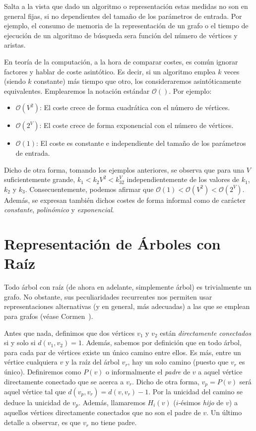 \documentclass[10pt,spanish,twocolumn]{article}
\begin{document}
\vspace{4mm}
Salta a la vista que dado un algoritmo o representación estas medidas no son en 
general fijas, si no dependientes del tamaño de los parámetros de entrada.  Por 
ejemplo, el consumo de memoria de la representación de un grafo o el tiempo de 
ejecución de un algoritmo de búsqueda sera función del número de vértices y 
aristas.

En teoría de la computación, a la hora de comparar costes, es común ignorar 
factores y hablar de coste asintótico.  Es decir, si un algoritmo emplea $k$ 
veces (siendo $k$ constante) más tiempo que otro, los consideraremos 
asintóticamente equivalentes.  Emplearemos la notación estándar 
$\mathcal{O}()$.  Por ejemplo:

\begin{itemize}
    \item $\mathcal{O}(V^2)$: El coste crece de forma cuadrática con el número 
de vértices.
    \item $\mathcal{O}(2^V)$: El coste crece de forma exponencial con el número 
de vértices.
    \item $\mathcal{O}(1)$: El coste es constante e independiente del tamaño de 
los parámetros de entrada.
\end{itemize}

Dicho de otra forma, tomando los ejemplos anteriores, se observa que para una 
$V$ suficientemente grande, $k_1 < k_2V^2 < k_32^V$ independientemente de los 
valores de $k_1$, $k_2$ y $k_3$.  Consecuentemente, podemos afirmar que 
$\mathcal{O}(1) < \mathcal{O}(V^2) < \mathcal{O}(2^V)$.  Además,
se expresan también dichos costes de forma informal como de carácter
\emph{constante}, \emph{polinómico} y \emph{exponencial}.

\section{Representación de Árboles con Raíz}
Todo árbol con raíz (de ahora en adelante, simplemente árbol) es trivialmente 
un grafo.  No obstante, sus peculiaridades recurrentes nos permiten usar 
representaciones alternativas (y en general, más adecuadas) a las que se 
emplean para grafos (véase Cormen~\cite[Ch22.1]{Cormen:01}).

Antes que nada, definimos que dos vértices $v_1$ y $v_2$ están 
\emph{directamente conectados} si y solo si $d(v_1, v_2) = 1$.  Además, sabemos 
por definición que en todo árbol, para cada par de vértices existe un
único camino entre ellos.  Es más, entre un vértice cualquiera $v$ y la raíz 
del árbol $v_r$, hay un solo camino (puesto que $v_r$ es único).  Definiremos 
como $P(v)$ o informalmente el \emph{padre} de $v$ a aquel vértice directamente 
conectado que se acerca a $v_r$.  Dicho de otra forma, $v_p = P(v)$ será aquel 
vértice tal que $d(v_p, v_r) = d(v, v_r) - 1$.  Por la unicidad del camino se 
deduce la unicidad de $v_p$.  Además, llamaremos $H_i(v)$ ($i$-ésimos 
\emph{hijo} de $v$) a aquellos vértices directamente conectados que no son el 
padre de $v$.  Un último detalle a observar, es que $v_r$ no tiene padre.
\end{document}
